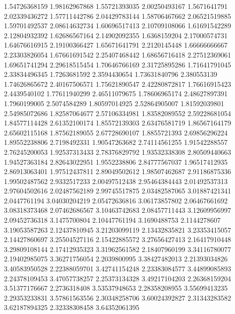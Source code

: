   1.54726368159    1.98162967868
  1.55721393035    2.00250493167
   1.5671641791    2.02339436272
  1.57711442786    2.04429783144
  1.58706467662    2.06521519885
  1.59701492537    2.08614632734
  1.60696517413    2.10709108066
  1.61691542289    2.12804932392
  1.62686567164    2.14902092355
   1.6368159204    2.17000574731
  1.64676616915    2.19100366427
  1.65671641791     2.2120145448
  1.66666666667    2.23303826054
  1.67661691542    2.25407468442
  1.68656716418    2.27512369061
  1.69651741294    2.29618515454
  1.70646766169    2.31725895286
  1.71641791045    2.33834496345
   1.7263681592     2.3594430654
  1.73631840796      2.380553139
  1.74626865672    2.40167506571
  1.75621890547    2.42280872817
  1.76616915423     2.4439540102
  1.77611940299    2.46511079675
  1.78606965174    2.48627897391
   1.7960199005     2.5074584289
  1.80597014925    2.52864905007
  1.81592039801    2.54985072686
  1.82587064677    2.57106334981
  1.83582089552    2.59228681054
  1.84577114428    2.61352100174
  1.85572139303    2.63476581719
  1.86567164179    2.65602115168
  1.87562189055    2.67728690107
   1.8855721393    2.69856296224
  1.89552238806     2.7198492331
  1.90547263682    2.74114561255
  1.91542288557    2.76245200053
  1.92537313433    2.78376829792
  1.93532338308    2.80509440663
  1.94527363184    2.82643022951
   1.9552238806    2.84777567037
  1.96517412935    2.86913063401
  1.97512437811    2.89049502612
  1.98507462687    2.91186875336
  1.99502487562     2.9332517233
  2.00497512438    2.95464384443
  2.01492537313    2.97604502616
  2.02487562189    2.99745517875
  2.03482587065    3.01887421341
   2.0447761194    3.04030204219
  2.05472636816    3.06173857802
  2.06467661692    3.08318373468
  2.07462686567    3.10463742683
  2.08457711443    3.12609956997
  2.09452736318     3.1475700804
  2.10447761194     3.1690488753
   2.1144278607    3.19053587263
  2.12437810945    3.21203099119
  2.13432835821    3.23353415057
  2.14427860697    3.25504527116
  2.15422885572    3.27656427413
  2.16417910448    3.29809108144
  2.17412935323    3.31962561582
  2.18407960199    3.34116780077
  2.19402985075    3.36271756054
   2.2039800995    3.38427482013
  2.21393034826    3.40583950528
  2.22388059701    3.42741154248
  2.23383084577    3.44899085893
  2.24378109453    3.47057738257
  2.25373134328    3.49217104203
  2.26368159204    3.51377176667
   2.2736318408    3.53537948653
  2.28358208955    3.55699413235
  2.29353233831    3.57861563556
  2.30348258706    3.60024392827
  2.31343283582    3.62187894325
  2.32338308458    3.64352061395
